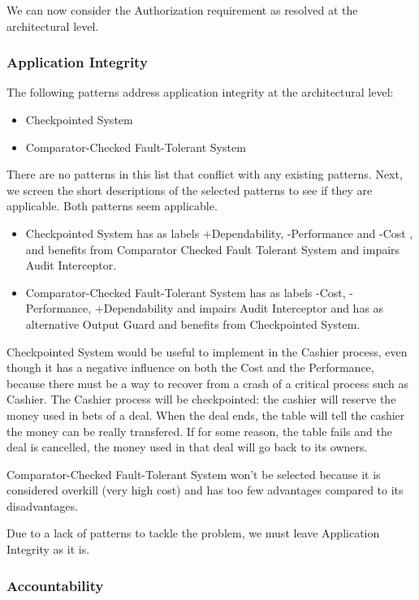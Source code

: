 \documentclass[a4paper,11pt]{report}
\begin{document}
We can now consider the Authorization requirement as resolved at the architectural level.

\subsubsection{Application Integrity}
\label{ArchitecturalApplicationIntegrity}
The following patterns address application integrity at the architectural level:
\begin{itemize}
\item Checkpointed System
\item Comparator-Checked Fault-Tolerant System
\end{itemize}

There are no patterns in this list that conflict with any existing patterns.
Next, we screen the short descriptions of the selected patterns to see if they are applicable. Both patterns seem
applicable.

\begin{itemize}
\item Checkpointed System has as labels +Dependability, -Performance and -Cost , and benefits from Comparator Checked
 Fault Tolerant System and impairs Audit Interceptor.

\item Comparator-Checked Fault-Tolerant System has as labels -Cost, -Performance, +Dependability and impairs Audit
Interceptor and has as alternative Output Guard and benefits from Checkpointed System.
\end{itemize}

Checkpointed System would be useful to implement in the Cashier process, even though it has a negative influence on both the Cost and the Performance,
because there must be a way to recover from a crash of a critical process such as Cashier. The Cashier process
will be checkpointed: the cashier will reserve the money used in bets of a deal. When the deal ends, the table
will tell the cashier the money can be really transfered. If for some reason, the table fails and the deal is
cancelled, the money used in that deal will go back to its owners.


Comparator-Checked Fault-Tolerant System won't be selected because it is considered overkill (very high cost) and has too few
advantages compared to its disadvantages.

Due to a lack of patterns to tackle the problem, we must leave Application Integrity as it is.

\subsubsection{Accountability}
\end{document}

